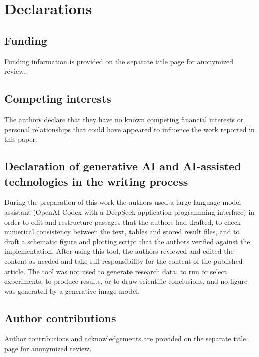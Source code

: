 \documentclass[pdflatex,sn-basic]{sn-jnl}
\begin{document}
\section*{Declarations}

\subsection*{Funding}
Funding information is provided on the separate title page for anonymized review.

\subsection*{Competing interests}
The authors declare that they have no known competing financial interests or personal
relationships that could have appeared to influence the work reported in this paper.

\subsection*{Declaration of generative AI and AI-assisted technologies in the writing process}
During the preparation of this work the authors used a large-language-model assistant
(OpenAI Codex with a DeepSeek application programming interface) in order to edit and restructure
passages that the authors had drafted, to check numerical consistency between the text, tables
and stored result files, and to draft a schematic figure and plotting script that the authors
verified against the implementation. After using this tool, the authors reviewed and edited the
content as needed and take full responsibility for the content of the published article. The
tool was not used to generate research data, to run or select experiments, to produce results, or
to draw scientific conclusions, and no figure was generated by a generative image model.

\subsection*{Author contributions}
Author contributions and acknowledgements are provided on the separate title page
for anonymized review.


\end{document}
